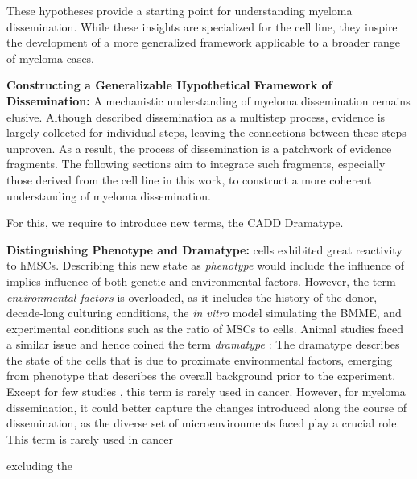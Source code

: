 These hypotheses  provide a starting
point for understanding myeloma dissemination. While these insights are
specialized for the \INA cell line, they inspire the development of a more
generalized framework applicable to a broader range of myeloma cases.

\textbf{Constructing a Generalizable Hypothetical Framework of Dissemination:}
A mechanistic understanding of myeloma dissemination remains elusive. Although
\citet{zeissigTumourDisseminationMultiple2020} described dissemination as a
multistep process, evidence is largely collected for individual steps, leaving
the connections between these steps unproven. As a result, the process of
dissemination is a patchwork of evidence fragments. The following sections aim
to integrate such fragments, especially those derived from the \INA cell line in
this work, to construct a more coherent understanding of myeloma dissemination.

For this, we require to introduce new terms, the \ac{CADD} Dramatype.


\textbf{Distinguishing Phenotype and Dramatype:}
\INA cells exhibited great reactivity to \acp{hMSC}. Describing this new state
as \emph{phenotype} would include the influence of 
implies influence of both genetic and
environmental factors. However, the term \emph{environmental factors} is
overloaded, as it includes the history of the donor, decade-long culturing
conditions, the \textit{in vitro} model simulating the \ac{BMME}, and
experimental conditions such as the ratio of \acp{MSC} to \INA cells. Animal
studies faced a similar issue and hence coined the term
\emph{dramatype}
\cite{zutphenPrinciplesLaboratoryAnimal2001}: The dramatype describes the state
of the cells that is due to proximate environmental factors, emerging from
phenotype that describes the overall background prior to the experiment.
Except for few studies \cite{hinoStudiesFamilialTumors2004}, this term is rarely used
in cancer. However, for myeloma dissemination, it could better capture 
the changes introduced along the course of dissemination, as the diverse set of microenvironments faced play a crucial role. 
This term is rarely used in cancer

excluding the

